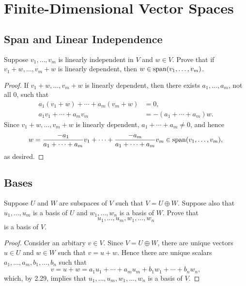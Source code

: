 \chapter{Finite-Dimensional Vector Spaces}

\section{Span and Linear Independence}

\begin{exercise}{10}
	Suppose \( v_{1}, \ldots, v_{m} \) is linearly independent in \( V \) and \( w \in V \). Prove that if \( v_{1} + w, \ldots, v_{m} + w \) is linearly dependent, then \( w \in \operatorname{span}(v_{1}, \ldots, v_{m}) \).
\end{exercise}

\begin{proof}
	If \( v_{1} + w, \ldots, v_{m} + w \) is linearly dependent, then there exists \( a_{1}, \ldots, a_{m} \), not all \( 0 \), such that
	\begin{align*}
		a_{1}(v_{1} + w) + \cdots + a_{m}(v_{m} + w) &= 0, \\
		            a_{1}v_{1} + \cdots + a_{m}v_{m} &= -(a_{1} + \cdots + a_{m})w.
	\end{align*}
	Since \( v_{1} + w, \ldots, v_{m} + w \) is linearly dependent, \( a_{1} + \cdots + a_{m} \neq 0 \), and hence
	\[
		w = \frac{-a_{1}}{a_{1} + \cdots + a_{m}}v_{1} + \cdots + \frac{-a_{m}}{a_{1} + \cdots + a_{m}}v_{m} \in \operatorname{span}(v_{1}, \ldots, v_{m}),
	\]
	as desired.
\end{proof}

\section{Bases}

\begin{exercise}{8}
	Suppose \( U \) and \( W \) are subspaces of \( V \) such that \( V = U \oplus W \). Suppose also that \( u_{1}, \ldots, u_{m} \) is a basis of \( U \) and \( w_{1}, \ldots, w_{n} \) is a basis of \( W \). Prove that
	\[
		u_{1}, \ldots, u_{m}, w_{1}, \ldots, w_{n}
	\]
	is a basis of \( V \).
\end{exercise}

\begin{proof}
	Consider an arbitary \( v \in V \). Since \( V = U \oplus W \), there are unique vectors \( u \in U \) and \( w \in W \) such that \( v = u + w \). Hence there are unique scalars \( a_{1}, \ldots, a_{m}, b_{1}, \ldots, b_{n} \) such that
	\[
		v = u + w = a_{1}u_{1} + \cdots + a_{m}u_{m} + b_{1}w_{1} + \cdots + b_{n}w_{n},
	\]
	which, by 2.29, implies that \( u_{1}, \ldots, u_{m}, w_{1}, \ldots, w_{n} \) is a basis of \( V \).
\end{proof}

